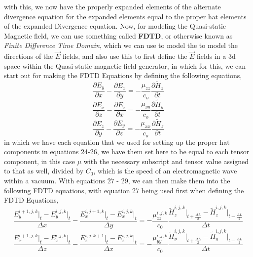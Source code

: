 \documentclass[]{article}
\begin{document}
with this, we now have the properly expanded elements of the alternate divergence equation for the expanded elements equal to the proper hat elements of the expanded Divergence equation. Now, for modeling the Quasi-static Magnetic field, we can use something called \textbf{FDTD}, or otherwise known as \textit{Finite Difference Time Domain}, which we can use to model the to model the directions of the $\vec{E}$ fields, and also use this to first define the $\vec{E}$ fields in a 3d space within the Quasi-static magnetic field generator, in which for this, we can start out for making the FDTD Equations by defining the following equations,
\begin{equation}
\frac{\partial{E}_y}{\partial{x}} - \frac{\partial{E}_x}{\partial{y}} = -\frac{\mu_{zz}}{c_{o}} \frac{\partial{\tilde{H}_z}}{\partial{t}}
\end{equation}
\begin{equation}
\frac{\partial{E}_x}{\partial{z}} - \frac{\partial{E}_z}{\partial{x}} = -\frac{\mu_{yy}}{c_{o}} \frac{\partial{\tilde{H}_y}}{\partial{t}}
\end{equation}
\begin{equation}
\frac{\partial{E}_z}{\partial{y}} - \frac{\partial{E}_y}{\partial{z}} = -\frac{\mu_{xx}}{c_{o}} \frac{\partial{\tilde{H}_z}}{\partial{t}}
\end{equation}
in which we have each equation that we used for setting up the proper hat components in equations 24-26, we have them set here to be equal to each tensor component, in this case $\mu$ with the necessary subscript and tensor value assigned to that as well, divided by $C_0$, which is the speed of an electromagnetic wave within a vacuum. With equations 27 - 29, we can then make them into the following FDTD equations, with equation 27 being used first when defining the FDTD Equations,
\begin{equation}
\frac{E_{y}^{i+1, j, k} \Big|_t - E_{y}^{i,j,k}\Big|_t}{\Delta{x}} - \frac{E_{x}^{i, j+1, k} \Big|_t - E_{x}^{i,j,k}\Big|_t}{\Delta{y}} = -\frac{\mu_{zz}^{i,j,k}}{c_0} \frac{\tilde{H}_{z}^{i,j,k}\Big|_{t+\frac{\Delta{L}}{2}} - \tilde{H}_{z}^{i,j,k}\Big|_{t - \frac{\Delta{L}}{2}}}{\Delta{t}}
\end{equation} 
\begin{equation}
\frac{E_{x}^{i+1, j, k} \Big|_t - E_{x}^{i,j,k}\Big|_t}{\Delta{z}} - \frac{E_{z}^{i, j, k+1} \Big|_t - E_{z}^{i,j,k}\Big|_t}{\Delta{x}} = -\frac{\mu_{yy}^{i,j,k}}{c_0} \frac{\tilde{H}_{y}^{i,j,k}\Big|_{t+\frac{\Delta{L}}{2}} - \tilde{H}_{y}^{i,j,k}\Big|_{t - \frac{\Delta{L}}{2}}}{\Delta{t}}
\end{equation}
\end{document}
